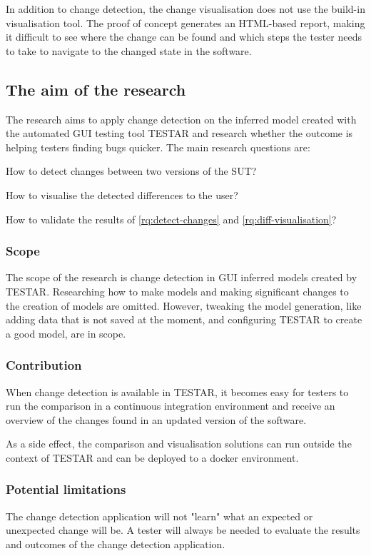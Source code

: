 In addition to change detection, the change visualisation does not use the build-in visualisation tool. The proof of concept generates an HTML-based report, making it difficult to see where the change can be found and which steps the tester needs to take to navigate to the changed state in the software.

\subsection{The aim of the research}
The research aims to apply change detection on the inferred model created with the automated GUI testing tool TESTAR and research whether the outcome is helping testers finding bugs quicker. The main research questions are:

\begin{questions}
    \item How to detect changes between two versions of the SUT?
	\item How to visualise the detected differences to the user? 
\item How to validate the results of \ref{rq:detect-changes} and \ref{rq:diff-visualisation}?
\end{questions}

\subsubsection{Scope}
The scope of the research is change detection in GUI inferred models created by TESTAR. Researching how to make models and making significant changes to the creation of models are omitted. However, tweaking the model generation, like adding data that is not saved at the moment, and configuring TESTAR to create a good model, are in scope.

\subsubsection{Contribution}
When change detection is available in TESTAR, it becomes easy for testers to run the comparison in a continuous integration environment and receive an overview of the changes found in an updated version of the software.

As a side effect, the comparison and visualisation solutions can run outside the context of TESTAR and can be deployed to a docker environment.

\subsubsection{Potential limitations}
The change detection application will not "learn" what an expected or unexpected change will be. A tester will always be needed to evaluate the results and outcomes of the change detection application.


